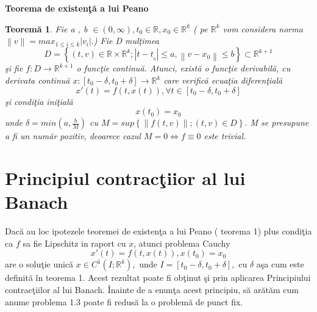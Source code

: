\documentclass[a4paper,12pt,oneside]{report}
\newtheorem{theorem}{Teorem\u a}
\begin{document}
\textbf{Teorema de existen\c{t}\u{a} a lui Peano }
\begin{theorem}
Fie a , b \(\in \left ( 0, \infty  \right ) , t_{0} \in \mathbb{R}, x_{0} \in \mathbb{R}^{k}\) ( pe \(\mathbb{R}^{k}\) vom considera norma \(\left \| v \right \| =  max _{1\leq i\leq k }\left | v_{i} \right |.\)) Fie D mul\c{t}imea
\begin{displaymath}
  D = \left \{ \left ( t,v \right )  \in \mathbb{R} \times \mathbb{R}^{k} ; \left | t - t_{_{0}} \right | \leq a , \left \| v - x_{0} \right \| \leq b\right \} \subset \mathbb{R}^{k + 1}
\end{displaymath}
\c{s}i fie \(f : D \rightarrow \mathbb{R}^{k+1}\) o func\c{t}ie continu\u{a}. Atunci, exist\u{a} o func\c{t}ie derivabil\u{a}, cu derivata continu\u{a} \(x : \left [ t_{0}-\delta ,t_{0}+\delta   \right ]\rightarrow \mathbb{R}^{k}\) care verific\u{a} ecua\c{t}ia diferen\c{t}ial\u{a}
  \begin{displaymath}
    {x}' \left ( t \right ) = f\left ( t,x\left ( t \right ) \right ), \forall t \in \left [ t_{0}-\delta ,t_{0}+\delta   \right ]
    \label{eq:1.1} \tag{1.1}
  \end{displaymath}
\c{s}i condi\c{t}ia  ini\c{t}ial\u{a}
\begin{displaymath}
  x\left ( t_{0} \right ) = x_{0} \label{eq:1.2} \tag{1.2}
\end{displaymath}
unde \(\delta = min\left ( a,\frac{b}{M} \right )\) cu \(M = sup \left \{\left \| f\left ( t,v \right ) \right \| ;\left ( t,v \right ) \in D \right \}.\) M se presupune a fi un num\u{a}r pozitiv, deoarece cazul \(M = 0 \Leftrightarrow f \equiv 0\) este trivial.
\end{theorem}

\section{Principiul contrac\c{t}iior al lui Banach}

Dac\u{a} au loc ipotezele teoremei de existen\c{t}a a lui Peano ( teorema 1) plus condi\c{t}ia ca $f$ sa fie Lipschitz in raport cu $x$, atunci problema Cauchy
\begin{displaymath}
  {x}'\left ( t \right ) = f\left ( t,x\left ( t \right ) \right ), x\left ( t_{0} \right ) = x_{0} \label{eq:1.3} \tag{1.3}
\end{displaymath}
are o solu\c{t}ie unic\u{a} \(x \in C^{1} \left ( I ; \mathbb{R}^{k} \right ),\) unde \(I = \left [ t_{0}-\delta ,t_{0}+\delta   \right ] ,\) cu \(\delta\) a\c{s}a cum este definit\u{a} \^{i}n teorema 1. Acest rezultat poate fi ob\c{t}inut \c{s}i prin aplicarea Principiului contrac\c{t}iilor al lui Banach. \^{I}nainte de a enun\c{t}a acest principiu, s\u{a} ar\u{a}t\u{a}m cum anume problema 1.3 poate fi redus\u{a} la o problem\u{a} de punct fix.
\end{document}
